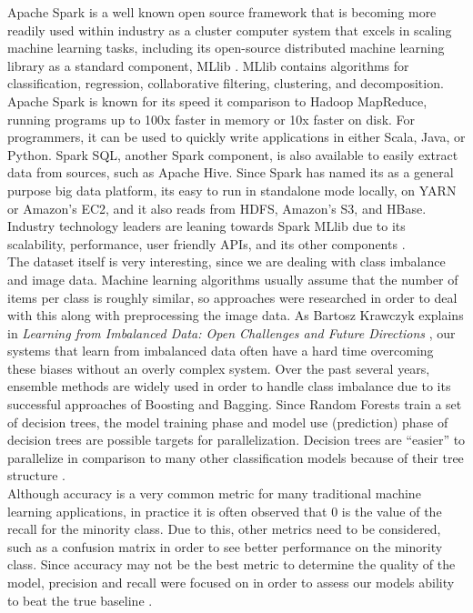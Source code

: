 \documentclass{neu_handout}
\begin{document}
Apache Spark is a well known open source framework that is becoming more readily used within industry as a cluster computer system that excels in scaling machine learning tasks, including its open-source distributed machine learning library as a standard component, MLlib \cite{mllib}. MLlib contains algorithms for classification, regression, collaborative filtering, clustering, and decomposition. Apache Spark is known for its speed it comparison to Hadoop MapReduce, running programs up to 100x faster in memory or 10x faster on disk. For programmers, it can be used to quickly write applications in either Scala, Java, or Python. Spark SQL, another Spark component, is also available to easily extract data from sources, such as Apache Hive. Since Spark has named its as a general purpose big data platform, its easy to run in standalone mode locally, on YARN or Amazon's EC2, and it also reads from HDFS, Amazon's S3, and HBase. Industry technology leaders are leaning towards Spark MLlib due to its scalability, performance, user friendly APIs, and its other components \cite{stanford}.\\

The dataset itself is very interesting, since we are dealing with class imbalance and image data. Machine learning algorithms usually assume that the number of items per class is roughly similar, so approaches were researched in order to deal with this along with preprocessing the image data. As Bartosz Krawczyk explains in \textit{Learning from Imbalanced Data: Open Challenges and Future Directions} \cite{Krawczyk}, our systems that learn from imbalanced data often have a hard time overcoming these biases without an overly complex system. Over the past several years, ensemble methods are widely used in order to handle class imbalance due to its successful approaches of Boosting and Bagging. Since Random Forests train a set of decision trees, the model training phase and model use (prediction) phase of decision trees are possible targets for parallelization. Decision trees are ``easier'' to parallelize in comparison to many other classification models because of their tree structure \cite{parallelrf}. \\

Although accuracy is a very common metric for many traditional machine learning applications, in practice it is often observed that 0 is the value of the recall for the minority class. Due to this, other metrics need to be considered, such as a confusion matrix in order to see better performance on the minority class. Since accuracy may not be the best metric to determine the quality of the model, precision and recall were focused on in order to assess our models ability to beat the true baseline \cite{imbalance}.
\end{document}
